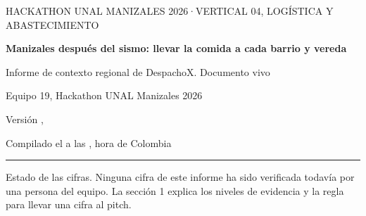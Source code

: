 \begin{titlepage}
\RaggedRight
\vspace*{2.2cm}
{\sffamily\small\color{gris} HACKATHON UNAL MANIZALES 2026\quad·\quad VERTICAL 04, LOGÍSTICA Y ABASTECIMIENTO\par}
\vspace{1.4cm}
{\sffamily\bfseries\fontsize{25}{31}\selectfont\color{titulo} Manizales después del sismo: llevar la comida a cada barrio y vereda\par}
\vspace{0.9cm}
{\Large Informe de contexto regional de DespachoX. Documento vivo\par}
\vspace{2.4cm}
{\sffamily\large Equipo 19, Hackathon UNAL Manizales 2026\par}
\vspace{0.5cm}
{\large Versión \versioninforme, \fechaversion\par}
\vspace{0.2cm}
{\color{gris} Compilado el \fechacompilacion{} a las \horacompilacion, hora de Colombia\par}
\vfill
{\color{titulo}\rule{\linewidth}{0.5pt}}\par
\vspace{0.3em}
{\small Estado de las cifras. Ninguna cifra de este informe ha sido verificada todavía por una persona del equipo. La sección 1 explica los niveles de evidencia y la regla para llevar una cifra al pitch.\par}
\end{titlepage}
\setcounter{page}{2}
